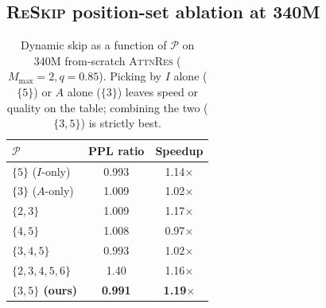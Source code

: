 \documentclass{article}
\newcommand{\attnres}{\textsc{AttnRes}}
\newcommand{\reskip}{\textsc{ReSkip}}
\begin{document}
\subsection{\reskip{} position-set ablation at 340M}
\label{app:reskip_position_ablation}
\begin{table}[h]
\caption{Dynamic skip as a function of $\mathcal{P}$ on 340M from-scratch \attnres{} ($M_{\max}{=}2, q{=}0.85$). Picking by $I$ alone ($\{5\}$) or $A$ alone ($\{3\}$) leaves speed or quality on the table; combining the two ($\{3,5\}$) is strictly best.}
\label{tab:reskip_position_ablation}
\centering\small
\begin{tabular}{lcc}
\toprule
$\mathcal{P}$ & PPL ratio & Speedup \\
\midrule
$\{5\}$ ($I$-only) & 0.993 & 1.14$\times$ \\
$\{3\}$ ($A$-only) & 1.009 & 1.02$\times$ \\
$\{2,3\}$ & 1.009 & 1.17$\times$ \\
$\{4,5\}$ & 1.008 & 0.97$\times$ \\
$\{3,4,5\}$ & 0.993 & 1.02$\times$ \\
$\{2,3,4,5,6\}$ & 1.40 & 1.16$\times$ \\
\midrule
\textbf{$\{3,5\}$ (ours)} & \textbf{0.991} & \textbf{1.19$\times$} \\
\bottomrule
\end{tabular}
\end{table}
\end{document}
